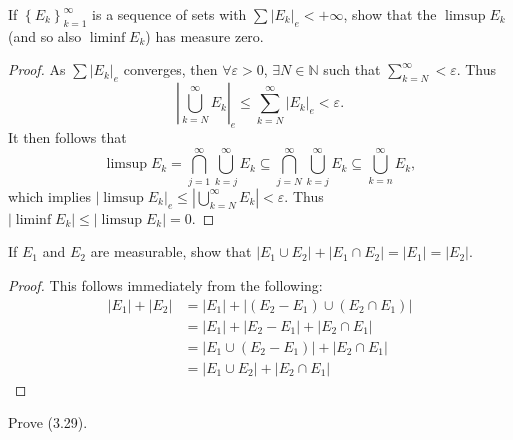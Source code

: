 \documentclass[12pt]{book}
\newcommand{\set}[1]{\left\{ #1 \right\}}
\renewcommand{\u}{\cup}
\renewcommand{\i}{\cap}
\newcommand{\bu}{\bigcup}
\newcommand{\bi}{\bigcap}
\renewcommand{\ss}{\subseteq}
\newcommand{\N}{\mathbb{N}}
\renewcommand{\.}{\mkern1mu}
\newcommand{\e}{\varepsilon}
\newcommand{\abs}[1]{\left| #1 \right|}
\newcommand{\seq}[2]{\set{#1_{#2}}_{#2=1}^{\infty}}
\theoremstyle{theorem}
\begin{document}
\item If $\seq{E}{k}$ is a sequence of sets with $\sum\abs{E_k}_e < +\infty$, show that the $\limsup E_k$ (and so also $\liminf E_k$) has measure zero.
	\begin{proof}
	As $\sum \abs{E_k}_e$ converges, then $\forall \e >0$, $\exists N\in\N$ such that $\sum_{k=N}^\infty < \e$. Thus 
		\[ \abs{\bu_{k=N}^\infty E_k}_e \leq \sum_{k=N}^\infty \abs{E_k}_e < \e. \]
	It then follows that
		\[ \limsup E_k = \bi_{j=1}^\infty\bu_{k=j}^\infty E_k \ss \bi_{j=N}^\infty \bu_{k=j}^\infty E_k \ss \bu_{k=n}^\infty E_k,\]
	which implies $\abs{\limsup E_k}_e \leq \abs{\bu_{k=N}^\infty E_k} < \e$. Thus $\abs{\liminf E_k} \leq \abs{\limsup E_k} = 0$.
	\end{proof}
\item If $E_1$ and $E_2$ are measurable, show that $\abs{E_1 \u E_2} + \abs{E_1 \i E_2} = \abs{E_1} = \abs{E_2}.$
	\begin{proof}
	This follows immediately from the following:
		\begin{align*}
		\abs{E_1} + \abs{E_2} &= \abs{E_1} + \abs{(E_2-E_1)\u(E_2\i E_1)}\\
			&= \abs{E_1} + \abs{E_2 - E_1} + \abs{E_2\i E_1}\\
			&= \abs{E_1 \u (E_2 - E_1)} + \abs{E_2\i E_1}\\
			&= \abs{E_1\u E_2} + \abs{E_2\i E_1}
		\end{align*}
	\end{proof}
\item Prove (3.29).
\end{document}
